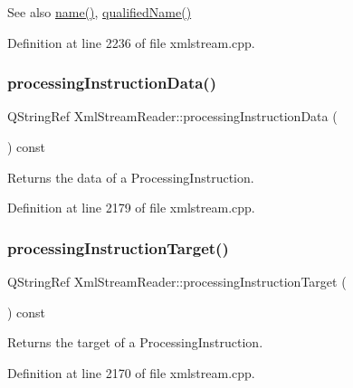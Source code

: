 \begin{DoxySeeAlso}{See also}
\hyperlink{class_xml_stream_reader_a09b44691e1e74daa6bdd4ed465d3c0a2}{name()}, \hyperlink{class_xml_stream_reader_a1afff37e8245261beb5c31db56912b8c}{qualified\+Name()} 
\end{DoxySeeAlso}


Definition at line 2236 of file xmlstream.\+cpp.

\mbox{\label{class_xml_stream_reader_a2c9146676cc92895abaadc89f6fbc738}} 
\subsubsection{\texorpdfstring{processing\+Instruction\+Data()}{processingInstructionData()}}
{\footnotesize\ttfamily Q\+String\+Ref Xml\+Stream\+Reader\+::processing\+Instruction\+Data (\begin{DoxyParamCaption}{ }\end{DoxyParamCaption}) const}

Returns the data of a Processing\+Instruction. 

Definition at line 2179 of file xmlstream.\+cpp.

\mbox{\label{class_xml_stream_reader_a66bd483fca16586142dd890cacb9b967}} 
\subsubsection{\texorpdfstring{processing\+Instruction\+Target()}{processingInstructionTarget()}}
{\footnotesize\ttfamily Q\+String\+Ref Xml\+Stream\+Reader\+::processing\+Instruction\+Target (\begin{DoxyParamCaption}{ }\end{DoxyParamCaption}) const}

Returns the target of a Processing\+Instruction. 

Definition at line 2170 of file xmlstream.\+cpp.

\mbox{\label{class_xml_stream_reader_a1afff37e8245261beb5c31db56912b8c}} 
